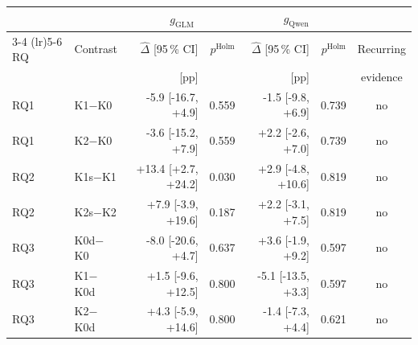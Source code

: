 \begin{tabular}{@{}llrrrrc@{}}
  \toprule
   & & \multicolumn{2}{c}{$g_{\mathrm{GLM}}$} & \multicolumn{2}{c}{$g_{\mathrm{Qwen}}$} & \\
  \cmidrule(lr){3-4} \cmidrule(lr){5-6}
  RQ & Contrast & $\widehat\Delta$ [95\,\% CI] & $p^{\mathrm{Holm}}$ & $\widehat\Delta$ [95\,\% CI] & $p^{\mathrm{Holm}}$ & Recurring \\
   & & [pp] & & [pp] & & evidence \\
  \midrule
  RQ1 & K1$-$K0 & -5.9 [-16.7, +4.9] & 0.559 & -1.5 [-9.8, +6.9] & 0.739 & no \\
  \rowcolor{black!6} RQ1 & K2$-$K0 & -3.6 [-15.2, +7.9] & 0.559 & +2.2 [-2.6, +7.0] & 0.739 & no \\
  RQ2 & K1s$-$K1 & +13.4 [+2.7, +24.2] & 0.030 & +2.9 [-4.8, +10.6] & 0.819 & no \\
  \rowcolor{black!6} RQ2 & K2s$-$K2 & +7.9 [-3.9, +19.6] & 0.187 & +2.2 [-3.1, +7.5] & 0.819 & no \\
  RQ3 & K0d$-$K0 & -8.0 [-20.6, +4.7] & 0.637 & +3.6 [-1.9, +9.2] & 0.597 & no \\
  \rowcolor{black!6} RQ3 & K1$-$K0d & +1.5 [-9.6, +12.5] & 0.800 & -5.1 [-13.5, +3.3] & 0.597 & no \\
  RQ3 & K2$-$K0d & +4.3 [-5.9, +14.6] & 0.800 & -1.4 [-7.3, +4.4] & 0.621 & no \\
  \bottomrule
\end{tabular}
